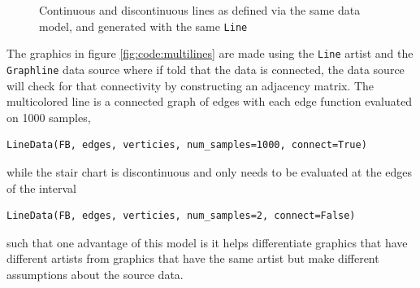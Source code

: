 \documentclass[journal]{vgtc}                %
\begin{document}
\begin{figure}[htb]
  \centering 
\caption{Continuous and discontinuous lines as defined via the same data model, and generated with the same \vartisteq \texttt{Line}}
\label{fig:code:multilines}
\end{figure}
The graphics in figure \autoref{fig:code:multilines} are made using the \texttt{Line} artist and the \texttt{Graphline} data source where if told that the data is connected, the data source will check for that connectivity by constructing an adjacency matrix. The multicolored line is a connected graph of edges with each edge function evaluated on 1000 samples, 
\begin{verbatim}
LineData(FB, edges, verticies, num_samples=1000, connect=True)
\end{verbatim}
while the stair chart is discontinuous and only needs to be evaluated at the edges of the interval 
\begin{verbatim}
LineData(FB, edges, verticies, num_samples=2, connect=False)
\end{verbatim}
such that one advantage of this model is it helps differentiate graphics that have different artists from graphics that have the same artist but make different assumptions about the source data. 
\end{document}
